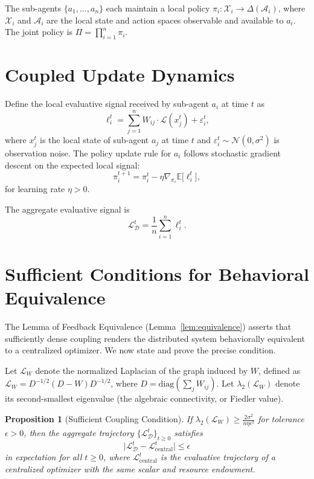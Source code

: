 \documentclass[12pt, oneside]{book}
\theoremstyle{plain}
\newtheorem{proposition}[theorem]{Proposition}
\theoremstyle{definition}
\theoremstyle{remark}
\theoremstyle{definition}
\begin{document}
The sub-agents $\{a_1, \ldots, a_n\}$ each maintain a local policy
$\pi_i : \mathcal{X}_i \to \Delta(\mathcal{A}_i)$, where $\mathcal{X}_i$ and
$\mathcal{A}_i$ are the local state and action spaces observable and available to
$a_i$. The joint policy is $\Pi = \prod_{i=1}^n \pi_i$.

\section{Coupled Update Dynamics}

Define the local evaluative signal received by sub-agent $a_i$ at time $t$ as
\[
\ell_i^t = \sum_{j=1}^n W_{ij} \cdot \mathcal{L}(x_j^t) + \varepsilon_i^t,
\]
where $x_j^t$ is the local state of sub-agent $a_j$ at time $t$ and
$\varepsilon_i^t \sim \mathcal{N}(0, \sigma^2)$ is observation noise. The policy
update rule for $a_i$ follows stochastic gradient descent on the expected local signal:
\[
\pi_i^{t+1} = \pi_i^t - \eta \nabla_{\pi_i} \mathbb{E}\bigl[\ell_i^t\bigr],
\]
for learning rate $\eta > 0$.

The aggregate evaluative signal is
\[
\mathcal{L}_\mathcal{D}^t = \frac{1}{n} \sum_{i=1}^n \ell_i^t.
\]

\section{Sufficient Conditions for Behavioral Equivalence}

The Lemma of Feedback Equivalence (Lemma~\ref{lem:equivalence}) asserts that
sufficiently dense coupling renders the distributed system behaviorally equivalent
to a centralized optimizer. We now state and prove the precise condition.

Let $\mathcal{L}_W$ denote the normalized Laplacian of the graph induced by $W$,
defined as $\mathcal{L}_W = D^{-1/2}(D - W)D^{-1/2}$, where
$D = \mathrm{diag}(\sum_j W_{ij})$. Let $\lambda_2(\mathcal{L}_W)$ denote its
second-smallest eigenvalue (the algebraic connectivity, or Fiedler value).

\begin{proposition}[Sufficient Coupling Condition]
\label{prop:coupling}
If $\lambda_2(\mathcal{L}_W) \geq \frac{2\sigma^2}{n \eta \epsilon^2}$ for
tolerance $\epsilon > 0$, then the aggregate trajectory
$\{\mathcal{L}_\mathcal{D}^t\}_{t \geq 0}$ satisfies
\[
\bigl|\mathcal{L}_\mathcal{D}^t - \mathcal{L}_{\text{central}}^t\bigr| \leq \epsilon
\]
in expectation for all $t \geq 0$, where $\mathcal{L}_{\text{central}}^t$ is the
evaluative trajectory of a centralized optimizer with the same scalar and resource
endowment.
\end{proposition}
\end{document}
